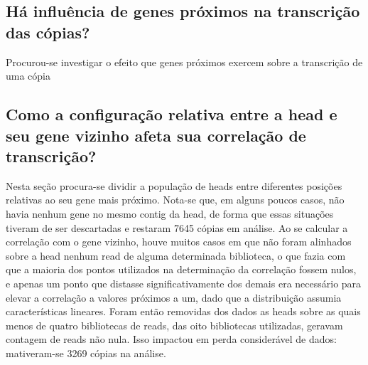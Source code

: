 \documentclass[12pt]{article}
\begin{document}
\begin{multicols}{2}
\subsection{Há influência de genes próximos na transcrição das cópias?}
Procurou-se investigar o efeito que genes próximos exercem sobre a transcrição de uma cópia


\subsection{Como a configuração relativa entre a head e seu gene vizinho afeta sua correlação de transcrição?}

Nesta seção procura-se dividir a população de heads entre diferentes posições relativas ao seu gene mais próximo. Nota-se que, em alguns poucos casos, não havia nenhum gene no mesmo contig da head, de forma que essas situações tiveram de ser descartadas e restaram 7645 cópias em análise. Ao se calcular a correlação com o gene vizinho, houve muitos casos em que não foram alinhados sobre a head nenhum read de alguma determinada biblioteca, o que fazia com que a maioria dos pontos utilizados na determinação da correlação fossem nulos, e apenas um ponto que distasse significativamente dos demais era necessário para elevar a correlação a valores próximos a um, dado que a distribuição assumia características lineares. Foram então removidas dos dados as heads sobre as quais menos de quatro bibliotecas de reads, das oito bibliotecas utilizadas, geravam contagem de reads não nula. Isso impactou em perda considerável de dados: mativeram-se 3269 cópias na análise.


\end{multicols}
\end{document}
